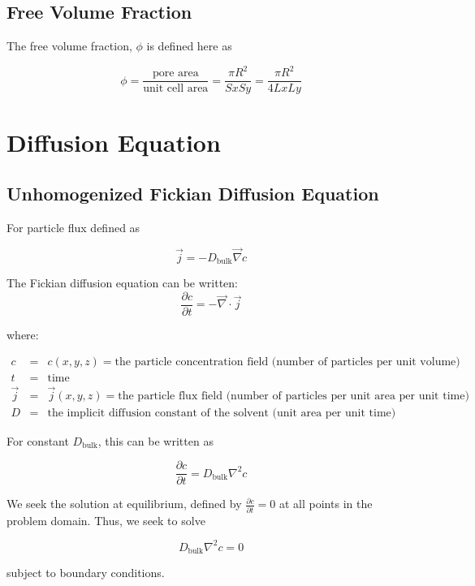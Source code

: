 \documentclass{article}
\begin{document}
\subsection{Free Volume Fraction}\label{subsec:volfrac}

The free volume fraction, $\phi$ is defined here as

$$\phi = \frac{\text{pore area}}{\text{unit cell area}}
= \frac{\pi R^2}{Sx Sy} = \frac{\pi R^2}{4 Lx Ly}$$

\section{Diffusion Equation}\label{sec:equation}

\subsection{Unhomogenized Fickian Diffusion Equation}\label{subsec:unhom_fick}

For particle flux defined as 

$$\vec{j} = - D_{\text{bulk}} \vec{\nabla} c$$

The Fickian diffusion equation can be written:
$$\frac{\partial c}{\partial t} = - \vec{\nabla} \cdot \vec{j}$$

where:

$\begin{array}{rcl}
c & = & c(x,y,z) = \text{the particle concentration field (number of particles per unit volume)} \\
t & = & \text{time} \\
\vec{j} & = & \vec{j}(x,y,z) = \text{the particle flux field (number of particles per unit area per unit time)} \\
D & = & \text{the implicit diffusion constant of the solvent (unit area per unit time)}
\end{array}$

For constant $D_{\text{bulk}}$, this can be written as

$$\frac{\partial c}{\partial t} = D_{\text{bulk}} \nabla^2 c$$

We seek the solution at equilibrium, defined by
$\frac{\partial c}{\partial t} = 0$ at all points in the problem domain.
Thus, we seek to solve

$$D_{\text{bulk}} \nabla^2 c = 0$$

subject to boundary conditions.
\end{document}

